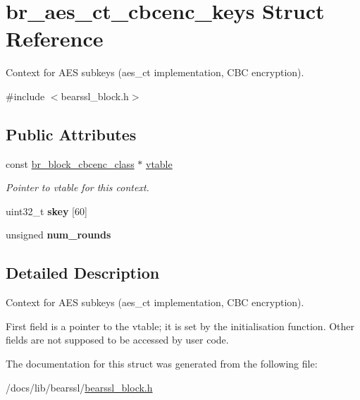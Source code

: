 \hypertarget{structbr__aes__ct__cbcenc__keys}{}\section{br\+\_\+aes\+\_\+ct\+\_\+cbcenc\+\_\+keys Struct Reference}
\label{structbr__aes__ct__cbcenc__keys}


Context for A\+ES subkeys ({\ttfamily aes\+\_\+ct} implementation, C\+BC encryption).  




{\ttfamily \#include $<$bearssl\+\_\+block.\+h$>$}

\subsection*{Public Attributes}
\begin{DoxyCompactItemize}
\item 
\mbox{\label{structbr__aes__ct__cbcenc__keys_a5de95e89490f15b176acb70a0c115752}} 
const \hyperlink{bearssl__block_8h_ad0ecff523e21a74dc1143dcfa52aa251}{br\+\_\+block\+\_\+cbcenc\+\_\+class} $\ast$ \hyperlink{structbr__aes__ct__cbcenc__keys_a5de95e89490f15b176acb70a0c115752}{vtable}
\begin{DoxyCompactList}\small\item\em Pointer to vtable for this context. \end{DoxyCompactList}\item 
\mbox{\label{structbr__aes__ct__cbcenc__keys_a86bf53ab81edfeef8344eaaf464777ae}} 
uint32\+\_\+t {\bfseries skey} \mbox{[}60\mbox{]}
\item 
\mbox{\label{structbr__aes__ct__cbcenc__keys_a49b1699fb13a0e0ec977374b3a969cd6}} 
unsigned {\bfseries num\+\_\+rounds}
\end{DoxyCompactItemize}


\subsection{Detailed Description}
Context for A\+ES subkeys ({\ttfamily aes\+\_\+ct} implementation, C\+BC encryption). 

First field is a pointer to the vtable; it is set by the initialisation function. Other fields are not supposed to be accessed by user code. 

The documentation for this struct was generated from the following file\+:\begin{DoxyCompactItemize}
\item 
/docs/lib/bearssl/\hyperlink{bearssl__block_8h}{bearssl\+\_\+block.\+h}\end{DoxyCompactItemize}
